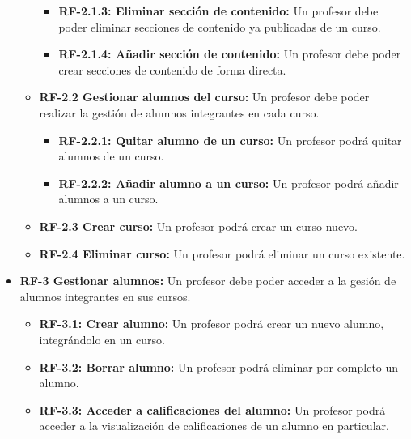 \begin{itemize}
\begin{itemize}
\begin{itemize}
\begin{itemize}
      \end{itemize}
    
    \item  
      \textbf{RF-2.1.3: Eliminar sección de contenido:} Un profesor debe poder eliminar secciones de contenido ya publicadas de un curso.
      
    \item  
      \textbf{RF-2.1.4: Añadir sección de contenido:} Un profesor debe poder crear secciones de contenido de forma directa.
      
    \end{itemize}
    
  \item
    \textbf{RF-2.2 Gestionar alumnos del curso:} Un profesor debe poder realizar la gestión de alumnos integrantes en cada curso.
    
    \begin{itemize}
    \tightlist
    \item
      \textbf{RF-2.2.1: Quitar alumno de un curso:} Un profesor podrá quitar alumnos de un curso.
        
    \item
      \textbf{RF-2.2.2: Añadir alumno a un curso:} Un profesor podrá añadir alumnos a un curso.
    \end{itemize}
    
  \item
    \textbf{RF-2.3 Crear curso:} Un profesor podrá crear un curso nuevo.
    
  \item
    \textbf{RF-2.4 Eliminar curso:} Un profesor podrá eliminar un curso existente.
    
  \end{itemize}
  
  \item
    \textbf{RF-3 Gestionar alumnos:} Un profesor debe poder acceder a la gesión de alumnos integrantes en sus cursos.
    
    \begin{itemize}
    \tightlist
    \item
      \textbf{RF-3.1: Crear alumno:} Un profesor podrá crear un nuevo alumno, integrándolo en un curso.
        
    \item
      \textbf{RF-3.2: Borrar alumno:} Un profesor podrá eliminar por completo un alumno.
      
    \item
      \textbf{RF-3.3: Acceder a calificaciones del alumno:} Un profesor podrá acceder a la visualización de calificaciones de un alumno en particular.
      

\end{itemize}
\end{itemize}
